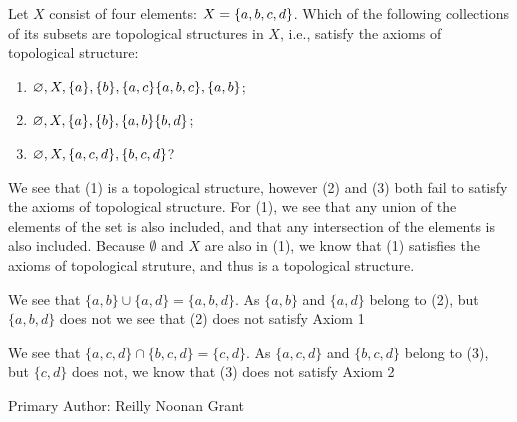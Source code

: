 \begin{minorEx} %
    Let $X$ consist of four elements: $X = \{a, b, c, d\}$. Which of the
    following collections of its subsets are topological structures in $X$,
    i.e., satisfy the axioms of topological structure:
    \begin{enumerate}
        \item $\varnothing, X, \{a\}, \{b\}, \{a,c\} \{a,b,c\},
            \{a,b\}$;
        \item $\varnothing, X, \{a\}, \{b\}, \{a,b\} \{b,d\}$;
        \item $\varnothing, X, \{a,c,d\}, \{b,c,d\}$?
    \end{enumerate}
\end{minorEx}

We see that (1) is a topological structure, however (2) and (3) both
fail to satisfy the axioms of topological structure. For (1), we see
that any union of the elements of the set is also included, and that
any intersection of the elements is also included. Because $\emptyset$
and $X$ are also in (1), we know that (1) satisfies the axioms of
topological struture, and thus is a topological structure. 

We see that $\{a,b\} \cup \{a,d\} = \{a,b,d\}$. As $\{a,b\}$ and
$\{a,d\} $ belong to (2), but $\{a,b,d\}$ does not we see that (2) does not
satisfy Axiom 1

We see that $\{a,c,d\} \cap \{b,c,d\} =\{c,d\}$. As $\{a,c,d\}$
and $\{b,c,d\}$ belong to (3), but $\{c,d\}$ does not, we know that 
(3) does not satisfy Axiom 2


Primary Author: Reilly Noonan Grant


